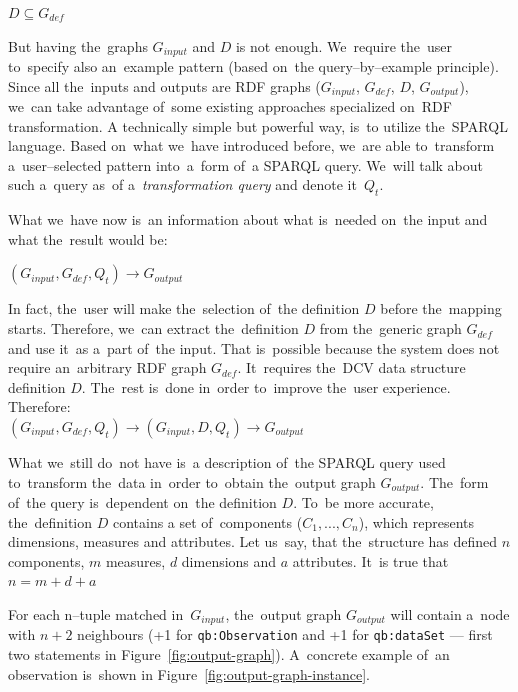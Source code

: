 {\centering $D \subseteq G_{def}$ \\[0.5cm]}

But having the~graphs $G_{input}$ and $D$ 
is not enough. We~require the~user to~specify also an~example pattern (based on~the
query--by--example principle). Since all the~inputs and outputs are RDF
graphs ($G_{input}$, $G_{def}$, $D$, $G_{output}$), we~can take 
advantage of~some existing approaches specialized on~RDF transformation. 
A technically simple but powerful way, is~to utilize the~SPARQL language. Based on~what we~have introduced before, we~are able to~transform a~user--selected pattern into~a~form of~a SPARQL
query. We~will talk about such a~query as~of a~\emph{transformation query} and denote it~$Q_t$.

What we~have now is~an information about what is~needed on~the input and 
what the~result would be:

{\centering $(G_{input}, G_{def}, Q_t) \rightarrow G_{output}$ \\[0.5cm]}

In fact, the~user will make the~selection of~the definition $D$ before the~mapping starts. Therefore, we~can extract the~definition $D$ from the~generic graph $G_{def}$ and use it~as a~part of~the input. That is~possible because 
the system does not require an~arbitrary RDF graph $G_{def}$. It~requires the~DCV 
data structure definition $D$. The~rest is~done in~order to~improve the~user 
experience. Therefore:\\

{\centering $(G_{input}, G_{def}, Q_t) \rightarrow (G_{input}, D, Q_t) \rightarrow G_{output}$  \\[0.5cm]}

What we~still do~not have is~a description of~the SPARQL query used to~transform the~data in~order to~obtain the~output graph $G_{output}$. The~form of~the query is~dependent on~the 
definition $D$. To~be more accurate, the~definition $D$ contains
a set of~components ($C_1, ... , C_n$), which represents dimensions, measures and attributes. Let us~say, that the~structure has defined $n$ components, $m$ measures, $d$ dimensions and $a$ 
attributes. It~is true that\\

{\centering $n = m+d+a$ \\[0.5cm]}

For each n--tuple matched in~$G_{input}$, the~output graph $G_{output}$ will contain a~node with $n+2$ 
neighbours (+1 for \verb|qb:Observation| and +1 for \verb|qb:dataSet| --- first two statements
in Figure~\ref{fig:output-graph}). A~concrete example of~an observation is~shown 
in Figure~\ref{fig:output-graph-instance}.

